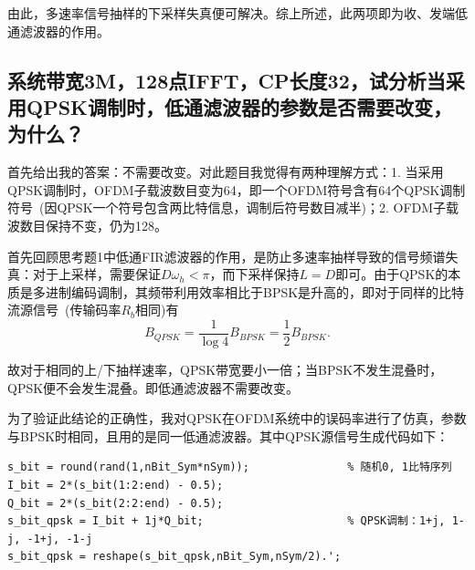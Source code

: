 \documentclass[a4paper,11pt,onecolumn,twoside]{article}
\begin{document}
由此，多速率信号抽样的下采样失真便可解决。综上所述，此两项即为收、发端低通滤波器的作用。

\subsection{系统带宽3M，128点IFFT，CP长度32，试分析当采用QPSK调制时，低通滤波器的参数是否需要改变，为什么？}
首先给出我的答案：不需要改变。对此题目我觉得有两种理解方式：1. 当采用QPSK调制时，OFDM子载波数目变为64，即一个OFDM符号含有64个QPSK调制符号~(因QPSK一个符号包含两比特信息，调制后符号数目减半)；2. OFDM子载波数目保持不变，仍为128。

首先回顾思考题1中低通FIR滤波器的作用，是防止多速率抽样导致的信号频谱失真：对于上采样，需要保证$D\omega_h<\pi$，而下采样保持$L=D$即可。由于QPSK的本质是多进制编码调制，其频带利用效率相比于BPSK是升高的，即对于同样的比特流源信号~(传输码率$R_b$相同)有
\begin{equation}
B_{QPSK} = \frac{1}{\log 4} B_{BPSK} = \frac{1}{2} B_{BPSK}.
\end{equation}

故对于相同的上/下抽样速率，QPSK带宽要小一倍；当BPSK不发生混叠时，QPSK便不会发生混叠。即低通滤波器不需要改变。

为了验证此结论的正确性，我对QPSK在OFDM系统中的误码率进行了仿真，参数与BPSK时相同，且用的是同一低通滤波器。其中QPSK源信号生成代码如下：
\begin{lstlisting}[style=Matlab-editor,
                   basicstyle=\mlttfamily,
                   caption={QPSK Modulation}, label=code3]
s_bit = round(rand(1,nBit_Sym*nSym));               % 随机0, 1比特序列
I_bit = 2*(s_bit(1:2:end) - 0.5);
Q_bit = 2*(s_bit(2:2:end) - 0.5);
s_bit_qpsk = I_bit + 1j*Q_bit;                      % QPSK调制：1+j, 1-j, -1+j, -1-j
s_bit_qpsk = reshape(s_bit_qpsk,nBit_Sym,nSym/2).';
\end{lstlisting}
\end{document}

